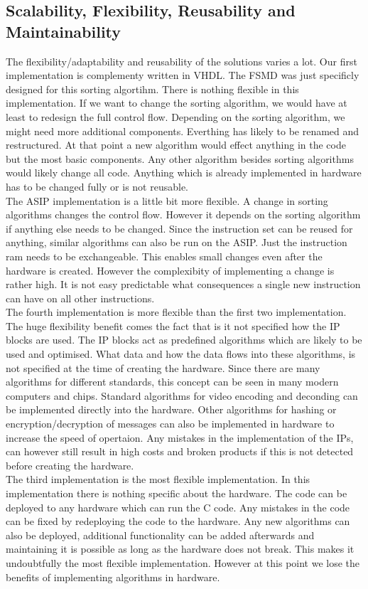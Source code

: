 \documentclass[conference]{IEEEtran}
\begin{document}
\subsection{Scalability, Flexibility, Reusability and Maintainability}
The flexibility/adaptability and reusability of the solutions varies a lot. Our first implementation is complementy written in VHDL. The FSMD was just specificly designed for this sorting algortihm. There is nothing flexible in this implementation. If we want to change the sorting algorithm, we would have at least to redesign the full control flow. Depending on the sorting algorithm, we might need more additional components. Everthing has likely to be renamed and restructured. At that point a new algorithm would effect anything in the code but the most basic components. Any other algorithm besides sorting algorithms would likely change all code. Anything which is already implemented in hardware has to be changed fully or is not reusable. \\
The ASIP implementation is a little bit more flexible. A change in sorting algorithms changes the control flow. However it depends on the sorting algorithm if anything else needs to be changed. Since the instruction set can be reused for anything, similar algorithms can also be run on the ASIP. Just the instruction ram needs to be exchangeable. This enables small changes even after the hardware is created. However the complexibity of implementing a change is rather high. It is not easy predictable what consequences a single new instruction can have on all other instructions. \\
The fourth implementation is more flexible than the first two implementation. The huge flexibility benefit comes the fact that is it not specified how the IP blocks are used. The IP blocks act as predefined algorithms which are likely to be used and optimised. What data and how the data flows into these algorithms, is not specified at the time of creating the hardware. Since there are many algorithms for different standards, this concept can be seen in many modern computers and chips. Standard algorithms for video encoding and deconding can be implemented directly into the hardware. Other algorithms for hashing or encryption/decryption of messages can also be implemented in hardware to increase the speed of opertaion. Any mistakes in the implementation of the IPs, can however still result in high costs and broken products if this is not detected before creating the hardware. \\
The third implementation is the most flexible implementation. In this implementation there is nothing specific about the hardware. The code can be deployed to any hardware which can run the C code. Any mistakes in the code can be fixed by redeploying the code to the hardware. Any new algorithms can also be deployed, additional functionality can be added afterwards and maintaining it is possible as long as the hardware does not break. This makes it undoubtfully the most flexible implementation. However at this point we lose the benefits of implementing algorithms in hardware. \\
\end{document}
